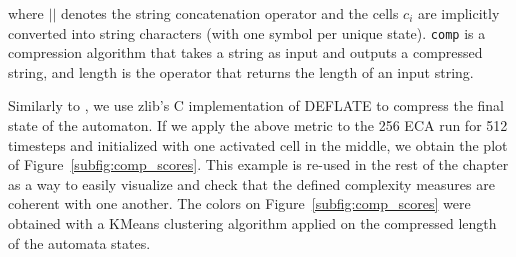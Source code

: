 where $||$ denotes the string concatenation operator and the cells $c_i$ are
implicitly converted into string characters (with one symbol per unique state).
\texttt{comp} is a compression algorithm that takes a string as input and
outputs a compressed string, and length is the operator that returns the length
of an input string.

Similarly to \parencite{kowaliwMeasuresComplexityArtificial2008,
  zenilCompressionBasedInvestigationDynamical2010}, we use zlib’s C
implementation of DEFLATE to compress the final state of the automaton. If we
apply the above metric to the 256 ECA run for 512 timesteps and initialized with
one activated cell in the middle, we obtain the plot of
Figure~\ref{subfig:comp_scores}. This example is re-used in the rest of the
chapter as a way to easily visualize and check that the defined complexity
measures are coherent with one another. The colors on
Figure~\ref{subfig:comp_scores} were obtained with a KMeans clustering algorithm
applied on the compressed length of the automata states.

